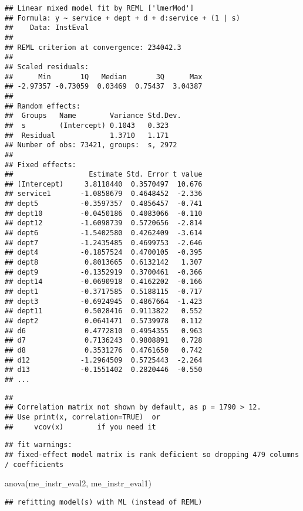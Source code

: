 \documentclass[
]{article}
\newenvironment{Shaded}{\begin{snugshade}}{\end{snugshade}}
\newcommand{\FunctionTok}[1]{\textcolor[rgb]{0.00,0.00,0.00}{#1}}
\newcommand{\NormalTok}[1]{#1}
\begin{document}
\begin{verbatim}
## Linear mixed model fit by REML ['lmerMod']
## Formula: y ~ service + dept + d + d:service + (1 | s)
##    Data: InstEval
## 
## REML criterion at convergence: 234042.3
## 
## Scaled residuals: 
##      Min       1Q   Median       3Q      Max 
## -2.97357 -0.73059  0.03469  0.75437  3.04387 
## 
## Random effects:
##  Groups   Name        Variance Std.Dev.
##  s        (Intercept) 0.1043   0.323   
##  Residual             1.3710   1.171   
## Number of obs: 73421, groups:  s, 2972
## 
## Fixed effects:
##                  Estimate Std. Error t value
## (Intercept)     3.8118440  0.3570497  10.676
## service1       -1.0858679  0.4648452  -2.336
## dept5          -0.3597357  0.4856457  -0.741
## dept10         -0.0450186  0.4083066  -0.110
## dept12         -1.6098739  0.5720656  -2.814
## dept6          -1.5402580  0.4262409  -3.614
## dept7          -1.2435485  0.4699753  -2.646
## dept4          -0.1857524  0.4700105  -0.395
## dept8           0.8013665  0.6132142   1.307
## dept9          -0.1352919  0.3700461  -0.366
## dept14         -0.0690918  0.4162202  -0.166
## dept1          -0.3717585  0.5188115  -0.717
## dept3          -0.6924945  0.4867664  -1.423
## dept11          0.5028416  0.9113822   0.552
## dept2           0.0641471  0.5739978   0.112
## d6              0.4772810  0.4954355   0.963
## d7              0.7136243  0.9808891   0.728
## d8              0.3531276  0.4761650   0.742
## d12            -1.2964509  0.5725443  -2.264
## d13            -0.1551402  0.2820446  -0.550
## ...
\end{verbatim}

\begin{verbatim}
## 
## Correlation matrix not shown by default, as p = 1790 > 12.
## Use print(x, correlation=TRUE)  or
##     vcov(x)        if you need it
\end{verbatim}

\begin{verbatim}
## fit warnings:
## fixed-effect model matrix is rank deficient so dropping 479 columns / coefficients
\end{verbatim}

\begin{Shaded}
\begin{Highlighting}[]
\FunctionTok{anova}\NormalTok{(me\_instr\_eval2, me\_instr\_eval1)}
\end{Highlighting}
\end{Shaded}

\begin{verbatim}
## refitting model(s) with ML (instead of REML)
\end{verbatim}
\end{document}
